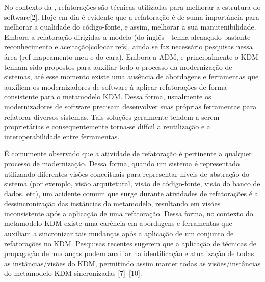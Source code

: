No contexto da , refatorações são técnicas utilizadas para melhorar a estrutura do software[2]. Hoje em dia é evidente que a refatoração é de suma importância para melhorar a qualidade do código-fonte, e assim, melhorar a sua manutenibilidade. Embora a refatoração dirigidas a modelo (do inglês -  tenha alcançado bastante reconhecimento e aceitação[colocar refs], ainda se faz necessário pesquisas nessa área (ref mapeamento meu e do cara). %
%
Embora a ADM, e principalmente o KDM tenham sido propostos para auxiliar todo o processo da modernização de sistemas, até esse momento existe uma ausência de abordagens e ferramentas que auxiliem os modernizadores de software à aplicar refatorações de forma consistente para o metamodelo KDM. Dessa forma, usualmente os modernizadores de software precisam desenvolver suas próprias ferramentas para refatorar diversos sistemas. Tais soluções geralmente tendem a serem proprietárias e consequentemente torna-se difícil a reutilização e a interoperabilidade entre ferramentas.


É comumente observado que a atividade de refatoração é pertinente a qualquer processo de modernização. Dessa forma, quando um sistema é representado utilizando diferentes visões conceituais para representar níveis de abstração do sistema (por exemplo, visão arquitetural, visão de código-fonte, visão do banco de dados, etc), um acidente comum que surge durante atividades de refatorações é a dessincronização das instâncias do metamodelo, resultando em visões inconsistente após a aplicação de uma refatoração. Dessa forma, no contexto do metamodelo KDM existe uma carência em abordagens e ferramentas que auxiliam a sincronizar tais mudanças após a aplicação de um conjunto de refatorações no KDM. Pesquisas recentes sugerem que a aplicação de técnicas de propagação de mudanças podem auxiliar na identificação e atualização de todas as instâncias/visões do KDM, permitindo assim manter todas as visões/instâncias do metamodelo KDM sincronizadas [7]–[10]. 


